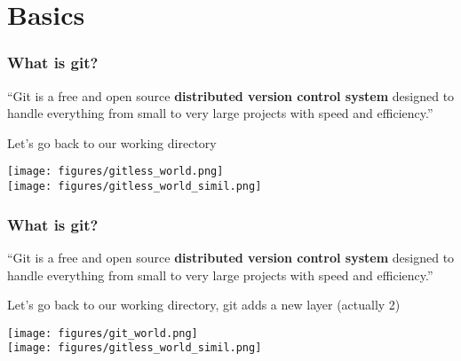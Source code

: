 \documentclass[xcolor=dvipsnames,10pt]{beamer}
\begin{document}
\section{Basics}
\begin{frame}
 \frametitle{What is git?}
 
 \begin{minipage}{1.0\textwidth}
  ``Git is a free and open source \textbf{distributed version control system} designed to handle everything from small to very large projects with speed and efficiency.''
 \end{minipage}
 \vspace*{0.4cm}
 
 \pause
 
 Let's go back to our working directory
 
 \begin{center}
 \texttt{[image: figures/gitless\_world.png]}\\
 \texttt{[image: figures/gitless\_world\_simil.png]}  
 \end{center}
 
\end{frame}
\addtocounter{framenumber}{-1}
\begin{frame}
 \frametitle{What is git?}
 
 \begin{minipage}{1.0\textwidth}
  ``Git is a free and open source \textbf{distributed version control system} designed to handle everything from small to very large projects with speed and efficiency.''
 \end{minipage}
 \vspace*{0.4cm}
 
 Let's go back to our working directory, git adds a new layer (actually 2) 
 
 \begin{center}
 \texttt{[image: figures/git\_world.png]}\\
 \texttt{[image: figures/gitless\_world\_simil.png]}  
 \end{center}
 
\end{frame}
\addtocounter{framenumber}{-1}
\end{document}
